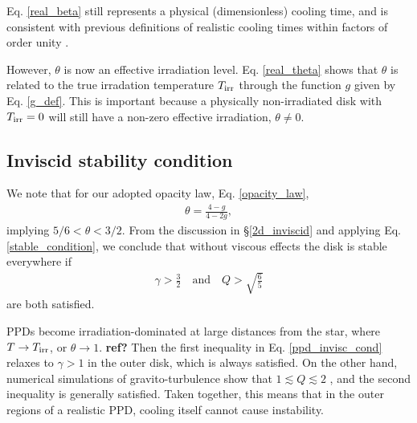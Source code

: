 Eq. \ref{real_beta} still represents a physical (dimensionless) cooling
time, and is consistent with previous definitions of realistic cooling
times within factors of order unity \citep[e.g.][their
Eq. 2]{kratter10}.  

However, $\theta$ is now an effective 
irradiation level. 
Eq. \ref{real_theta} shows that $\theta$ is related to the true
irradation temperature $T_\mathrm{irr}$ through the function $g$ given by 
Eq. \ref{g_def}. This is
important because a physically non-irradiated disk with $T_\mathrm{irr}=0$ will
still have a non-zero effective irradiation, $\theta\neq0$. 



\subsection{Inviscid stability condition}
We note that for our adopted opacity law, Eq. \ref{opacity_law}, 
\begin{align*}
  \theta = \frac{4-g}{4-2g},
\end{align*}
implying $5/6<\theta<3/2$. 
From the discussion in \S\ref{2d_inviscid} and applying
Eq. \ref{stable_condition},  we conclude that without viscous effects 
the disk is stable everywhere if  
\begin{align} 
  \gamma > \frac{3}{2} \quad \text{and} \quad Q >
  \sqrt{\frac{6}{5}} \label{ppd_invisc_cond} 
\end{align} 
are both satisfied.  

PPDs become irradiation-dominated at large distances from the star,
where $T\to T_\mathrm{irr}$, or $\theta\to 1$. {\bf ref?}
Then the first inequality in Eq. \ref{ppd_invisc_cond} relaxes to
$\gamma > 1$ in the outer disk, which is always satisfied.  
On the other hand, numerical simulations of gravito-turbulence
show that $1\lesssim Q \lesssim 2$ \citep{gammie01,rice11}, and 
the second inequality is generally satisfied. Taken together, this
means that in the outer regions of a realistic PPD, cooling itself
cannot cause instability.  

